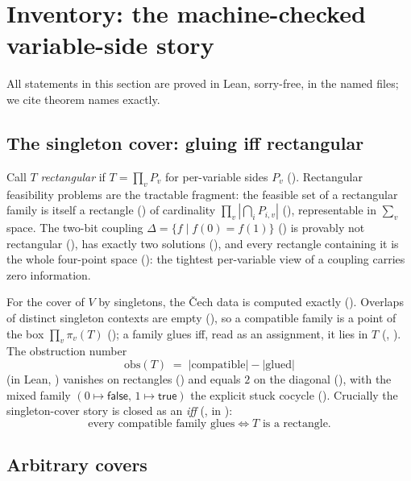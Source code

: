 \documentclass[11pt]{article}
\newcommand{\obs}{\mathrm{obs}}
\begin{document}
\section{Inventory: the machine-checked variable-side story}
\label{sec:inventory}

All statements in this section are proved in Lean, sorry-free, in the
named files; we cite theorem names exactly.

\subsection{The singleton cover: gluing iff rectangular}

Call $T$ \emph{rectangular} if $T = \prod_v P_v$ for per-variable
sides $P_v$ ().  Rectangular feasibility problems
are the tractable fragment: the feasible set of a rectangular family
is itself a rectangle () of
cardinality $\prod_v |{\bigcap_i P_{i,v}}|$
(), representable in $\sum_v$ space.  The
two-bit coupling $\Delta = \{f \mid f(0) = f(1)\}$
() is provably not rectangular
(), has exactly two solutions
(), and every rectangle containing it is the
whole four-point space
(): the tightest
per-variable view of a coupling carries zero information.

For the cover of $V$ by singletons, the \v{C}ech data is computed
exactly ().  Overlaps of distinct singleton
contexts are empty (), so a
compatible family is a point of the box $\prod_v \pi_v(T)$
(); a family glues iff, read as an
assignment, it lies in $T$ (,
).  The obstruction number
\[
  \obs(T) \;=\; |\mathrm{compatible}| - |\mathrm{glued}|
\]
(in Lean, ) vanishes on rectangles
() and
equals $2$ on the diagonal (), with
the mixed family $(0 \mapsto \mathsf{false},\, 1 \mapsto
\mathsf{true})$ the explicit stuck cocycle
().  Crucially the
singleton-cover story is closed as an \emph{iff}
(, in
):
\[
  \text{every compatible family glues}
  \iff
  T \text{ is a rectangle.}
\]

\subsection{Arbitrary covers}
\end{document}

